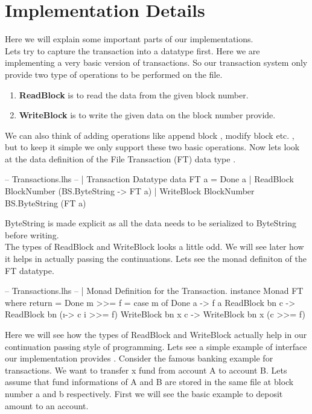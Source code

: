 \documentclass[11pt,a4paper]{article}
\begin{document}
\pagebreak
\section{Implementation Details}
Here we will explain some important parts of our implementations. \\
Lets try to capture the transaction into a datatype first. Here
we are implementing a very basic version of transactions. So our
transaction system only provide two type of operations to be performed
on the file.
\begin{enumerate}
\item \textbf{ReadBlock} is to read the data from the given block number.
\item \textbf{WriteBlock} is to write the given data on the block number provide.
\end{enumerate}
We can also think of adding operations like append block , modify block
etc. , but to keep it simple we only support these two basic operations.
Now lets look at the data definition of the File Transaction (FT) data
type . \\
\begin{code}
-- Transactions.lhs
-- | Transaction Datatype
data FT a = 
    Done a | 
    ReadBlock BlockNumber (BS.ByteString -> FT a) | 
    WriteBlock BlockNumber BS.ByteString (FT a)
\end{code}
ByteString is made explicit as all the data needs to be serialized to ByteString before writing.\\
The types of ReadBlock and WriteBlock looks a little odd. We will see later how it helps in actually passing the continuations.
Lets see the monad definiton of the FT datatype. \\
\begin{code}
-- Transactions.lhs
-- | Monad Definition for the Transaction. 
instance Monad FT where 
    return = Done 
    m >>= f = case m of 
        Done a -> f a 
        ReadBlock bn c -> ReadBlock bn (\i -> c i  >>= f) 
        WriteBlock bn x c -> WriteBlock bn x (c >>= f)
\end{code}
Here we will see how the types of ReadBlock and WriteBlock actually help
in our continuation passing style of programming. Lets see a simple
example of interface our implementation provides .
Consider the famous banking example for transactions. We want to
transfer x fund from account A to account B.
Lets assume that fund informations of A and B are stored in the same
file at block number a and b respectively.
First we will see the basic example to deposit amount to an account. 
\end{document}
